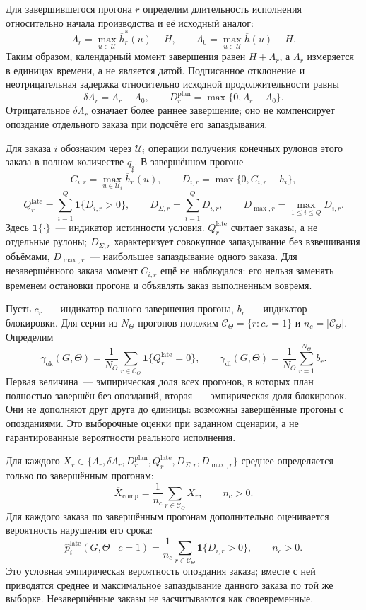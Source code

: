 Для завершившегося прогона $r$ определим длительность исполнения относительно начала производства и её исходный аналог:
\[
\Lambda_r=\max_{u\in\mathcal{U}}\overline{h}^{*}_r(u)-H,
\qquad
\Lambda_0=\max_{u\in\mathcal{U}}\overline{h}(u)-H.
\]
Таким образом, календарный момент завершения равен $H+\Lambda_r$, а $\Lambda_r$ измеряется в единицах времени, а не является датой. Подписанное отклонение и неотрицательная задержка относительно исходной продолжительности равны
\[
\delta\Lambda_r=\Lambda_r-\Lambda_0,\qquad
D^{\mathrm{plan}}_r=\max\{0,\Lambda_r-\Lambda_0\}.
\]
Отрицательное $\delta\Lambda_r$ означает более раннее завершение; оно не компенсирует опоздание отдельного заказа при подсчёте его запаздывания.

Для заказа $i$ обозначим через $\mathcal{U}_i$ операции получения конечных рулонов этого заказа в полном количестве $q_i$. В завершённом прогоне
\[
C_{i,r}=\max_{u\in\mathcal{U}_i}\overline{h}^{*}_r(u),\qquad
D_{i,r}=\max\{0,C_{i,r}-h_i\},
\]
\[
Q^{\mathrm{late}}_r=\sum_{i=1}^{Q}\mathbf{1}\{D_{i,r}>0\},\qquad
D_{\Sigma,r}=\sum_{i=1}^{Q}D_{i,r},\qquad
D_{\max,r}=\max_{1\leq i\leq Q}D_{i,r}.
\]
Здесь $\mathbf{1}\{\cdot\}$~--- индикатор истинности условия. $Q^{\mathrm{late}}_r$ считает заказы, а не отдельные рулоны; $D_{\Sigma,r}$ характеризует совокупное запаздывание без взвешивания объёмами, $D_{\max,r}$~--- наибольшее запаздывание одного заказа. Для незавершённого заказа момент $C_{i,r}$ ещё не наблюдался: его нельзя заменять временем остановки прогона и объявлять заказ выполненным вовремя.

Пусть $c_r$~--- индикатор полного завершения прогона, $b_r$~--- индикатор блокировки. Для серии из $N_{\Theta}$ прогонов положим $\mathcal{C}_{\Theta}=\{r:c_r=1\}$ и $n_c=|\mathcal{C}_{\Theta}|$. Определим
\[
\gamma_{\mathrm{ok}}(G,\Theta)=
\frac{1}{N_{\Theta}}\sum_{r\in\mathcal{C}_{\Theta}}
\mathbf{1}\{Q^{\mathrm{late}}_r=0\},\qquad
\gamma_{\mathrm{dl}}(G,\Theta)=\frac{1}{N_{\Theta}}\sum_{r=1}^{N_{\Theta}}b_r.
\]
Первая величина~--- эмпирическая доля всех прогонов, в которых план полностью завершён без опозданий, вторая~--- эмпирическая доля блокировок. Они не дополняют друг друга до единицы: возможны завершённые прогоны с опозданиями. Это выборочные оценки при заданном сценарии, а не гарантированные вероятности реального исполнения.

Для каждого $X_r\in\{\Lambda_r,\delta\Lambda_r,D^{\mathrm{plan}}_r,Q^{\mathrm{late}}_r,D_{\Sigma,r},D_{\max,r}\}$ среднее определяется только по завершённым прогонам:
\[
\overline{X}_{\mathrm{comp}}=\frac{1}{n_c}\sum_{r\in\mathcal{C}_{\Theta}}X_r,
\qquad n_c>0.
\]
Для каждого заказа по завершённым прогонам дополнительно оценивается вероятность нарушения его срока:
\[
\widehat{p}^{\mathrm{late}}_i(G,\Theta\mid c=1)
=\frac{1}{n_c}\sum_{r\in\mathcal{C}_{\Theta}}\mathbf{1}\{D_{i,r}>0\},
\qquad n_c>0.
\]
Это условная эмпирическая вероятность опоздания заказа; вместе с ней приводятся среднее и максимальное запаздывание данного заказа по той же выборке. Незавершённые заказы не засчитываются как своевременные.

